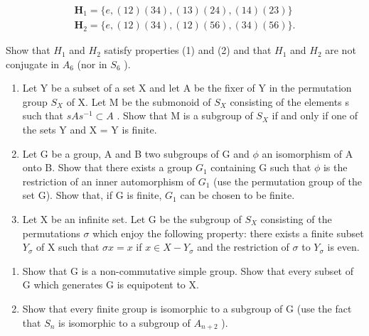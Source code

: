 \[
\begin{array}{l} \mathbf {H} _ {1} = \{e, (1 2) (3 4), (1 3) (2 4), (1 4) (2 3) \} \\ \mathbf {H} _ {2} = \{e, (1 2) (3 4), (1 2) (5 6), (3 4) (5 6) \}. \end{array}
\]

Show that \(H_{1}\) and \(H_{2}\) satisfy properties (1) and (2) and that \(H_{1}\) and \(H_{2}\) are not conjugate in \(A_{6}\) (nor in \(S_{6}\) ).

\begin{enumerate}
\def\labelenumi{\arabic{enumi}.}
\setcounter{enumi}{26}
\item
  Let Y be a subset of a set X and let A be the fixer of Y in the permutation group \(S_{X}\) of X. Let M be the submonoid of \(S_{X}\) consisting of the elements s such that \(sAs^{-1} \subset A\) . Show that M is a subgroup of \(S_{X}\) if and only if one of the sets Y and X = Y is finite.
\item
  Let G be a group, A and B two subgroups of G and \(\phi\) an isomorphism of A onto B. Show that there exists a group \(G_{1}\) containing G such that \(\phi\) is the restriction of an inner automorphism of \(G_{1}\) (use the permutation group of the set G). Show that, if G is finite, \(G_{1}\) can be chosen to be finite.
\item
  Let X be an infinite set. Let G be the subgroup of \(S_{X}\) consisting of the permutations \(\sigma\) which enjoy the following property: there exists a finite subset \(Y_{\sigma}\) of X such that \(\sigma x = x\) if \(x \in X - Y_{\sigma}\) and the restriction of \(\sigma\) to \(Y_{\sigma}\) is even.
\end{enumerate}

\begin{enumerate}
\def\labelenumi{(\alph{enumi})}
\item
  Show that G is a non-commutative simple group. Show that every subset of G which generates G is equipotent to X.
\item
  Show that every finite group is isomorphic to a subgroup of G (use the fact that \(S_{n}\) is isomorphic to a subgroup of \(A_{n+2}\) ).
\end{enumerate}

\BourbakiExercisesSection

